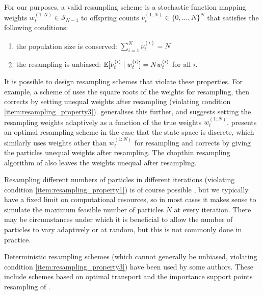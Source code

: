 \begin{defn}\label{defn:resampling}
For our purposes, a valid resampling scheme is a stochastic function mapping weights 
$w_t^{(1:N)} \in \mathcal{S}_{N-1}$ 
to offspring counts 
$\nu_t^{(1:N)} \in \{0,\dots,N\}^N $
that satisfies the following conditions:
\begin{enumerate}
\item\label{item:resampling_property1} the population size is conserved:
$ \sum_{i=1}^N \nu_t^{(i)} =N $
\item\label{item:resampling_property3} the resampling is unbiased:
$ \mathbb{E}[ \nu_t^{(i)} \mid w_t^{(i)} ] = N w_t^{(i)} $ for all $i$.
\end{enumerate}
\end{defn}
It is possible to design resampling schemes that violate these properties.
For example, a scheme of \textcite{liu1998} uses the square roots of the weights for resampling, then corrects by setting unequal weights after resampling (violating condition \ref{item:resampling_property3}).
\textcite[Section 3.1]{liu2001} generalises this further, and suggests setting the resampling weights adaptively as a function of the true weights $w_t^{(1:N)}$.
\textcite{fearnhead2003} presents an optimal resampling scheme in the case that the state space is discrete, which similarly uses weights other than $w_t^{(1:N)}$ for resampling and corrects by giving the particles unequal weights after resampling.
The chopthin resampling algorithm of \textcite{gandy2016} also leaves the weights unequal after resampling.

Resampling different numbers of particles in different iterations (violating condition \ref{item:resampling_property1}) is of course possible \parencite[see for example][]{crisan1998}, but we typically have a fixed limit on computational resources, so in most cases it makes sense to simulate the maximum feasible number of particles $N$ at every iteration.
There may be circumstances under which it is beneficial to allow the number of particles to vary adaptively \parencite{fox2003,chau2012,lee2018} or at random, but this is not commonly done in practice.

Deterministic resampling schemes (which cannot generally be unbiased, violating condition \ref{item:resampling_property3}) have been used by some authors. These include schemes based on optimal transport \parencite{reich2013, myers2021, corenflos2021} and the importance support points resampling of \textcite{huang2020}.

